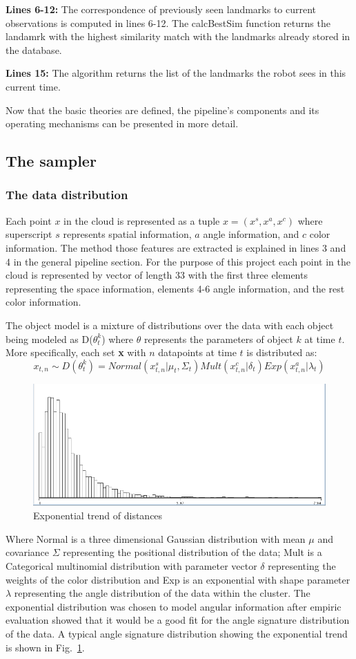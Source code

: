 \documentclass[]{article}
\begin{document}
\textbf{Lines 6-12:} The correspondence of previously seen landmarks to current observations is computed in lines 6-12. The calcBestSim function returns the landamrk with the highest similarity match with the landmarks already stored in the database.

\textbf{Lines 15:} The algorithm returns the list of the landmarks the robot sees in this current time.

Now that the basic theories are defined, the pipeline's components and its operating mechanisms can be presented in more detail.

\subsection{The sampler}

\subsubsection{The data distribution}
\label{data:dist}

Each point $x$ in the cloud is represented as a tuple $x =(x^s, x^a, x^c) $ where superscript $s$ represents spatial information, $a$ angle information, and $c$ color information. The method those features are extracted is explained in lines 3 and 4 in the general pipeline section. For the purpose of this project each point in the cloud is represented by vector of length 33 with the first three elements representing the space information, elements 4-6 angle information, and the rest color information.

The object model is a mixture of distributions over the data with each object being modeled as D($\theta_t^k$) where $\theta$ represents the parameters of object $k$ at time $t$. More specifically, each set \textbf{x} with $n$ datapoints at time $t$ is distributed as:
$$ x_{t,n} \sim D(\theta_t^k) = Normal(x_{t,n}^s| \mu_t, \Sigma_t) Mult(x_{t,n}^c | \delta_t) Exp(x_{t,n}^a | \lambda_t) $$

\begin{figure}
    \centering
    \includegraphics[width=.25\textwidth]{Kullback-Leibler}
    \caption{Exponential trend of distances}
    \label{pcl:kl}
\end{figure}

Where Normal is a three dimensional Gaussian distribution with mean $\mu$ and covariance $\Sigma$ representing the positional distribution of the data; Mult is a Categorical multinomial distribution with parameter vector $\delta$ representing the weights of the color distribution and Exp is an exponential with shape parameter $\lambda$ representing the angle distribution of the data within the cluster. The exponential distribution was chosen to model angular information after empiric evaluation showed that it would be a good fit for the angle signature distribution of the data. A typical angle signature distribution showing the exponential trend is shown in Fig.~\ref{pcl:kl}.
\end{document}

